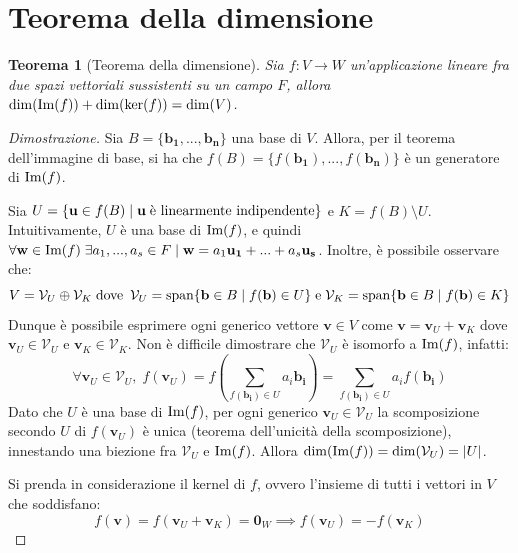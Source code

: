 \documentclass{article}
\newtheorem{theorem}{Teorema}
\begin{document}
\setlength{\parindent}{0pt}

\section{Teorema della dimensione}
\begin{theorem}[Teorema della dimensione]
    Sia $f : V \rightarrow W$ un'applicazione lineare fra due spazi vettoriali sussistenti su un campo $F$, allora $\dim(\textnormal{Im}(f)) + \dim(\ker(f)) = \dim(V)$.
\end{theorem}

\begin{proof}[Dimostrazione] 
    Sia $B = \{ \mathbf{b_1}, ..., \mathbf{b_n} \}$ una base di $V$. Allora, per il teorema dell'immagine di base, si ha che $f(B) = \{f(\mathbf{b_1}), ..., f(\mathbf{b_n})\}$ è un generatore di $\textnormal{Im}(f)$. 
    
    \vspace{10pt}
    Sia $U = \{ \mathbf{u} \in f(B) \; | \; \mathbf{u} \; \textnormal{è linearmente indipendente} \}$ e $K = f(B) \setminus U$. Intuitivamente, $U$ è una base di $\textnormal{Im}(f)$, e quindi
    $\forall \mathbf{w} \in \textnormal{Im}(f) \; \exists a_1, ..., a_s \in F \; | \; \mathbf{w} = a_1 \mathbf{u_1} + ... + a_s \mathbf{u_s}$. Inoltre, è possibile osservare che:
    \[
        V = \mathcal{V}_U \oplus \mathcal{V}_K \; \textnormal{dove} \;\: \mathcal{V}_U = \textnormal{span}\{\mathbf{b} \in B \; | \; f(\mathbf{b}) \in U\} \; \textnormal{e} \; \mathcal{V}_K = \textnormal{span}\{\mathbf{b} \in B \; | \; f(\mathbf{b}) \in K\} 
    \]
    Dunque è possibile esprimere ogni generico vettore $\mathbf{v} \in V$ come $\mathbf{v} = \mathbf{v}_U + \mathbf{v}_K$ dove $\mathbf{v}_U \in \mathcal{V}_U$ e $\mathbf{v}_K \in \mathcal{V}_K$.
    Non è difficile dimostrare che $\mathcal{V}_U$ è isomorfo a $\textnormal{Im}(f)$, infatti:
    \[
        \forall \mathbf{v}_U \in \mathcal{V}_U, \; f(\mathbf{v}_U) = f(\sum_{f(\mathbf{b_i}) \in U} a_i \mathbf{b_i}) = \sum_{f(\mathbf{b_i}) \in U} a_i f(\mathbf{b_i})
    \]
    Dato che $U$ è una base di $\textnormal{Im}(f)$, per ogni generico $\mathbf{v}_U \in \mathcal{V}_U$ la scomposizione secondo $U$ di $f(\mathbf{v}_U)$ è unica (teorema dell'unicità della scomposizione), innestando una biezione fra $\mathcal{V}_U$ e $\textnormal{Im}(f)$. Allora $\dim(\textnormal{Im}(f)) = \dim(\mathcal{V}_U) = |U|$.

    \vspace{10pt}
    Si prenda in considerazione il kernel di $f$, ovvero l'insieme di tutti i vettori in $V$ che soddisfano:
    \[
        f(\mathbf{v}) = f(\mathbf{v}_U + \mathbf{v}_K) = \mathbf{0}_W \implies f(\mathbf{v}_U) = -f(\mathbf{v}_K) 
    \]


\end{proof}
\end{document}

